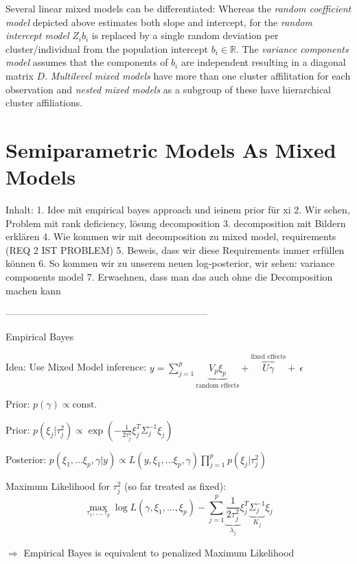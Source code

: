 \documentclass[12pt]{article}
\begin{document}
Several linear mixed models can be differentiated:
Whereas the \textit{random coefficient model} depicted above estimates both slope and intercept, for the \textit{random intercept model} $Z_ib_i$ is replaced by a single random deviation per cluster/individual from the population intercept $b_i \in \mathbb{R}$. The \textit{variance components model} assumes that the components of $b_i$ are independent resulting in a diagonal matrix $D$.
\textit{Multilevel mixed models} have more than one cluster affilitation for each observation and \textit{nested mixed models} as a subgroup of these have hierarchical cluster affiliations.


\section{Semiparametric Models As Mixed Models}\label{representation} %


Inhalt: 
1. Idee mit empirical bayes approach und ieinem prior für xi
2. Wir sehen, Problem mit rank deficiency, lösung decomposition
3. decomposition mit Bildern erklären
4. Wie kommen wir mit decomposition zu mixed model, requirements (REQ 2 IST PROBLEM)
5. Beweis, dass wir diese Requirements immer erfüllen können
6. So kommen wir zu unserem neuen log-posterior, wir sehen: variance components model
7. Erwaehnen, dass man das auch ohne die Decomposition machen kann

---------------------------------------------------------------

Empirical Bayes


Idea: Use Mixed Model inference: $y = \sum_{j=1}^p \underbrace{V_p \xi_p}_{\text{random effects}} + \overbrace{U \gamma}^{\text{fixed effects}} + \: \epsilon$ 


Prior:  $ p(\gamma) \propto \text{const.}$ 

Prior:   $p(\xi_j|\tau_j^2)  \propto \exp\left(-\frac{1}{2\tau^2_j} \xi_j^T\Sigma^{-1}_j \xi_j\right) $  

Posterior: 
$p(\xi_1, ... \xi_p, \gamma|y) \propto L(y,\xi_1, ... \xi_p, \gamma)\prod_{j=1}^p p(\xi_j|\tau_j^2) $ 

Maximum Likelihood for $\tau_j^2$ (so far treated as fixed):
$$\max_{\tau_1, ..., \tau_p} \log L(\gamma, \xi_1,...,\xi_p) - \sum_{j=1}^p \underbrace{\frac{1}{2\tau^2_j}}_{\lambda_j} \xi_j^T \underbrace{\Sigma^{-1}_j}_{K_j} \xi_j$$




$\Rightarrow$ Empirical Bayes is equivalent to penalized Maximum Likelihood
\end{document}
